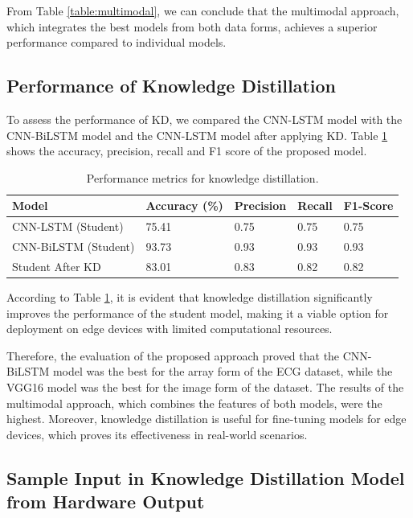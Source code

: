 \documentclass[conference]{IEEEtran}
\begin{document}
From Table \ref{table:multimodal}, we can conclude that the multimodal approach, which integrates the best models from both data forms, achieves a superior performance compared to individual models.

\subsection{Performance of Knowledge Distillation}

To assess the performance of KD, we compared the CNN-LSTM model with the CNN-BiLSTM model and the CNN-LSTM model after applying KD. Table \ref{table:knowledge_distillation} shows the accuracy, precision, recall and F1 score of the proposed model.

\begin{table}[!ht]
\centering
\caption{Performance metrics for knowledge distillation.}
\begin{tabularx}{\columnwidth}{|X|X|X|X|X|}
\hline
Model & Accuracy (\%) & Precision & Recall & F1-Score \\
\hline
CNN-LSTM (Student) & 75.41 & 0.75 & 0.75 & 0.75 \\
\hline
CNN-BiLSTM (Student) & 93.73 & 0.93 & 0.93 & 0.93 \\
\hline
Student After KD & 83.01 & 0.83 & 0.82 & 0.82 \\
\hline
\end{tabularx}
\label{table:knowledge_distillation}
\end{table}

According to Table \ref{table:knowledge_distillation}, it is evident that knowledge distillation significantly improves the performance of the student model, making it a viable option for deployment on edge devices with limited computational resources.

Therefore, the evaluation of the proposed approach proved that the CNN-BiLSTM model was the best for the array form of the ECG dataset, while the VGG16 model was the best for the image form of the dataset. The results of the multimodal approach, which combines the features of both models, were the highest. Moreover, knowledge distillation is useful for fine-tuning models for edge devices, which proves its effectiveness in real-world scenarios.


\subsection{Sample Input in Knowledge Distillation Model from Hardware Output}
\end{document}
